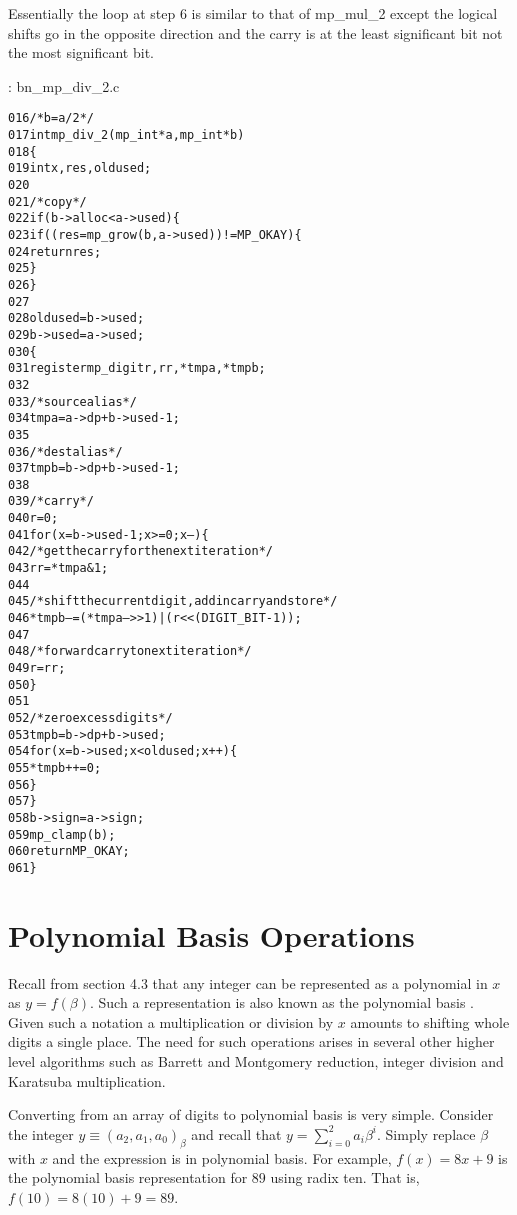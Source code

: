 \documentclass[b5paper]{book}
\begin{document}
Essentially the loop at step 6 is similar to that of mp\_mul\_2 except the logical shifts go in the opposite direction and the carry is at the 
least significant bit not the most significant bit.  

\vspace{+3mm}\begin{small}
\hspace{-5.1mm}{\bf File}: bn\_mp\_div\_2.c
\vspace{-3mm}
\begin{alltt}
016   /* b = a/2 */
017   int mp_div_2(mp_int * a, mp_int * b)
018   \{
019     int     x, res, oldused;
020   
021     /* copy */
022     if (b->alloc < a->used) \{
023       if ((res = mp_grow (b, a->used)) != MP_OKAY) \{
024         return res;
025       \}
026     \}
027   
028     oldused = b->used;
029     b->used = a->used;
030     \{
031       register mp_digit r, rr, *tmpa, *tmpb;
032   
033       /* source alias */
034       tmpa = a->dp + b->used - 1;
035   
036       /* dest alias */
037       tmpb = b->dp + b->used - 1;
038   
039       /* carry */
040       r = 0;
041       for (x = b->used - 1; x >= 0; x--) \{
042         /* get the carry for the next iteration */
043         rr = *tmpa & 1;
044   
045         /* shift the current digit, add in carry and store */
046         *tmpb-- = (*tmpa-- >> 1) | (r << (DIGIT_BIT - 1));
047   
048         /* forward carry to next iteration */
049         r = rr;
050       \}
051   
052       /* zero excess digits */
053       tmpb = b->dp + b->used;
054       for (x = b->used; x < oldused; x++) \{
055         *tmpb++ = 0;
056       \}
057     \}
058     b->sign = a->sign;
059     mp_clamp (b);
060     return MP_OKAY;
061   \}
\end{alltt}
\end{small}

\section{Polynomial Basis Operations}
Recall from section 4.3 that any integer can be represented as a polynomial in $x$ as $y = f(\beta)$.  Such a representation is also known as
the polynomial basis \cite[pp. 48]{ROSE}. Given such a notation a multiplication or division by $x$ amounts to shifting whole digits a single 
place.  The need for such operations arises in several other higher level algorithms such as Barrett and Montgomery reduction, integer
division and Karatsuba multiplication.  

Converting from an array of digits to polynomial basis is very simple.  Consider the integer $y \equiv (a_2, a_1, a_0)_{\beta}$ and recall that
$y = \sum_{i=0}^{2} a_i \beta^i$.  Simply replace $\beta$ with $x$ and the expression is in polynomial basis.  For example, $f(x) = 8x + 9$ is the
polynomial basis representation for $89$ using radix ten.  That is, $f(10) = 8(10) + 9 = 89$.  
\end{document}
